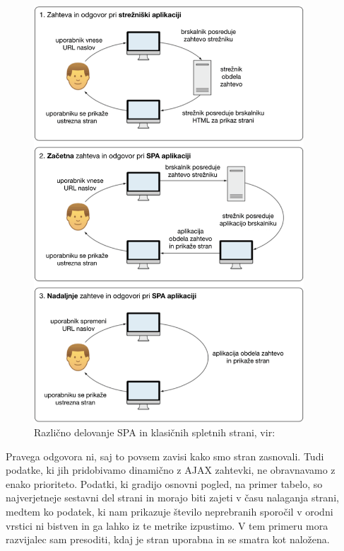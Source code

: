 \documentclass[a4paper, 12pt]{book}
\begin{document}
\begin{figure}[h]
	\begin{center}
		\includegraphics[width=0.9\textwidth]{Razlicni_nacini_obdelave_zahtev.png}
	\end{center}
	\caption{Različno delovanje SPA in klasičnih spletnih strani, vir: \cite{sp_skripta}}
	\label{img:diff_multipage_spa}
\end{figure}

Pravega odgovora ni, saj to povsem zavisi kako smo stran zasnovali. Tudi podatke, ki jih pridobivamo dinamično z AJAX zahtevki, ne obravnavamo z enako prioriteto. Podatki, ki gradijo osnovni pogled, na primer tabelo, so najverjetneje sestavni del strani in morajo biti zajeti v času nalaganja strani, medtem ko podatek, ki nam prikazuje število neprebranih sporočil v orodni vrstici ni bistven in ga lahko iz te metrike izpustimo. V tem primeru mora razvijalec sam presoditi, kdaj je stran uporabna in se smatra kot naložena.
\end{document}
